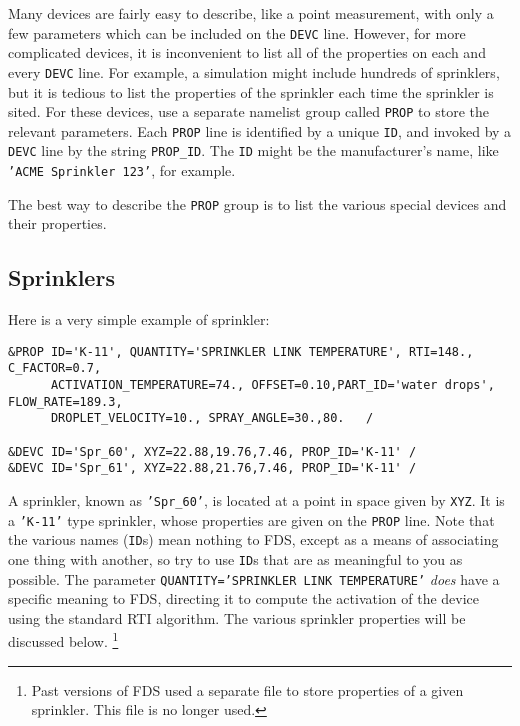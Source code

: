 \documentclass[11pt]{book}
\newcommand{\ct}{\tt\small}
\begin{document}
Many devices are fairly easy to describe, like a point measurement, with only a few parameters which can be included on the
{\ct DEVC} line. However, for more complicated devices, it is inconvenient to list all of the properties on each and every
{\ct DEVC} line. For example, a simulation might include hundreds of sprinklers, but it is tedious to list the properties of the
sprinkler each time the sprinkler is sited. For these devices, use a separate namelist group called {\ct PROP} to store the relevant parameters.
Each {\ct PROP} line is identified by a unique {\ct ID}, and invoked by a {\ct DEVC} line by the string {\ct PROP\_ID}.
The {\ct ID} might be the manufacturer's
name, like {\ct 'ACME Sprinkler 123'}, for example.

The best way to describe the {\ct PROP} group is to list the various special devices and their properties.


\subsection{Sprinklers}
\label{info:sprinklers}
 

Here is a very simple example of sprinkler:

\footnotesize
\begin{verbatim}
&PROP ID='K-11', QUANTITY='SPRINKLER LINK TEMPERATURE', RTI=148., C_FACTOR=0.7,
      ACTIVATION_TEMPERATURE=74., OFFSET=0.10,PART_ID='water drops', FLOW_RATE=189.3,
      DROPLET_VELOCITY=10., SPRAY_ANGLE=30.,80.   /

&DEVC ID='Spr_60', XYZ=22.88,19.76,7.46, PROP_ID='K-11' /
&DEVC ID='Spr_61', XYZ=22.88,21.76,7.46, PROP_ID='K-11' /
\end{verbatim} \normalsize

\noindent
A sprinkler, known as {\ct 'Spr\_60'}, is located at a point in space given by {\ct XYZ}. It is a {\ct 'K-11'} type sprinkler, whose properties are given on
the {\ct PROP} line. Note that the various names ({\ct ID}s) mean nothing to FDS, except as a means of associating one thing with another, so try to use {\ct ID}s that are as
meaningful to you as possible.  The parameter {\ct QUANTITY='SPRINKLER LINK TEMPERATURE'} {\em does} have a specific meaning to FDS, directing it to compute the activation of
the device using the standard RTI algorithm. The various sprinkler properties will be discussed below.
\footnote{Past versions of FDS used a separate file to store
properties of a given sprinkler. This file is no longer used.}
\end{document}
